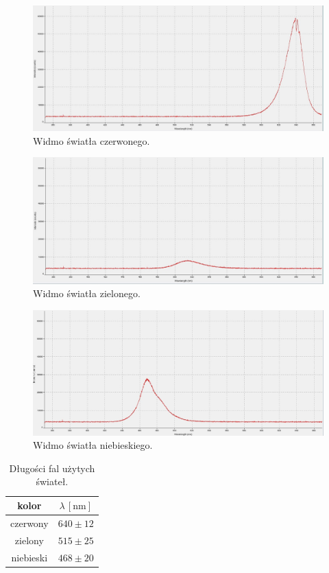 \documentclass[12pt]{article}
\begin{document}
\begin{figure}[H]
	\centering\includegraphics[scale=0.3]{red_wavelength}
	\caption{Widmo światła czerwonego.}
	\label{fig:red_wavelength}
\end{figure}
\begin{figure}[H]
	\centering
	\includegraphics[scale=0.3]{green_wavelength}
	\caption{Widmo światła zielonego.}
	\label{fig:green_wavelength}
\end{figure}
\begin{figure}[H]
	\centering
	\includegraphics[scale=0.3]{blue_wavelength}
	\caption{Widmo światła niebieskiego.}
	\label{fig:blue_wavelength}
\end{figure}

\begin{table}[H]
	\centering
	\begin{tabular}{c|c}
		\toprule
		kolor     & \(\lambda\,[\mathrm{nm}]\) \\
		\midrule
		czerwony  & \(640 \pm 12\)             \\
		zielony   & \(515 \pm 25\)             \\
		niebieski & \(468 \pm 20\)             \\
		\bottomrule
	\end{tabular}
	\caption{Długości fal użytych świateł.}
	\label{tab:wavelength}
\end{table}
\end{document}
